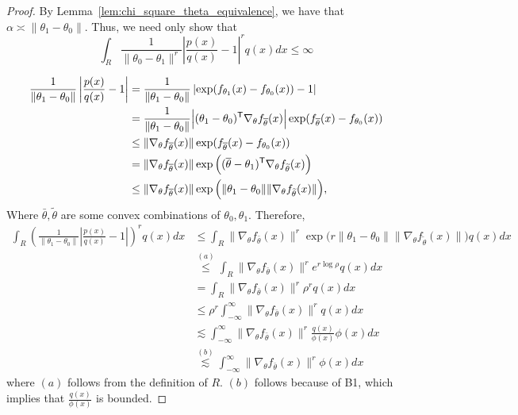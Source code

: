 \documentclass{article}
\begin{document}
\begin{proof}
By Lemma~\ref{lem:chi_square_theta_equivalence}, we have that $\alpha \asymp \| \theta_1 - \theta_0 \|$. Thus, we need only show that
\[
\int_R \frac{1}{\| \theta_0 - \theta_1 \|^r} \left| \frac{p(x)}{q(x)} - 1 \right|^r q(x) dx \leq \infty
\]




\begin{align*}
\frac{1}{\| \theta_1 - \theta_0\|}  \left| \frac{p(x)}{q(x)} - 1 \right| &=
    \frac{1}{\| \theta_1 - \theta_0\|}  
        \left| \exp( f_{\theta_1}(x) - f_{\theta_0}(x) ) - 1 \right| \\
   &=  \frac{1}{\| \theta_1 - \theta_0\|} \Big|(\theta_1 - \theta_0)^{\mathsf{T}} \nabla_{\theta} f_{\overline{\theta}}(x)  \Big|
      \exp( f_{\overline{\theta}}(x) - f_{\theta_0}(x)) \\
  &\leq \| \nabla_{\theta} f_{\overline{\theta}}(x) \|   \exp( f_{\overline{\theta}}(x) - f_{\theta_0}(x)) \\
  &= \|  \nabla_{\theta} f_{\overline{\theta}}(x) \| 
       \exp\Big( (\overline{\theta} - \theta_1)^{\mathsf{T}} \nabla_{\theta} f_{\widetilde{\theta}}(x) \Big) \\
  &\leq  \|  \nabla_{\theta} f_{\overline{\theta}}(x) \| 
        \exp\Big( \| \theta_1 - \theta_0\| \| \nabla_{\theta} f_{\widetilde{\theta}}(x) \| \Big),
\end{align*}
Where $\bar{\theta}, \tilde{\theta}$ are some convex combinations of $\theta_0, \theta_1$. Therefore, 
\begin{align*}
\int_R \left( \frac{1}{\| \theta_1 - \theta_0\|} \left| \frac{p(x)}{q(x)} - 1 \right| \right)^r q(x) dx &\leq
    \int_R  \|  \nabla_{\theta} f_{\bar{\theta}}(x) \|^r
        \exp\Big( r \| \theta_1 - \theta_0\| \| \nabla_{\theta} f_{\tilde{\theta}}(x) \| \Big)  q(x) dx \\
  &\stackrel{(a)}\leq   \int_R  \|  \nabla_{\theta} f_{\bar{\theta}}(x) \|^r
        e^{r \log \rho}  q(x) dx \\
  &= \int_{R}  \|  \nabla_{\theta} f_{\bar{\theta}}(x) \|^r
       \rho^r  q(x) d x \\
  &\leq \rho^r  \int_{-\infty}^{\infty} \|  \nabla_{\theta} f_{\bar{\theta}}(x) \|^r
        q(x) d x \\ 
  &\lesssim \int_{-\infty}^{\infty} \|  \nabla_{\theta} f_{\bar{\theta}}(x) \|^r
        \frac{q(x)}{\phi(x)} \phi(x) d x \\
  &\stackrel{(b)} \lesssim  \int_{-\infty}^{\infty} \|  \nabla_{\theta} f_{\bar{\theta}}(x) \|^r
          \phi(x) d x
\end{align*}
where $(a)$ follows from the definition of $R$. $(b)$ follows because of B1, which implies that $\frac{q(x)}{\phi(x)}$ is bounded. 

\end{proof}
\end{document}
